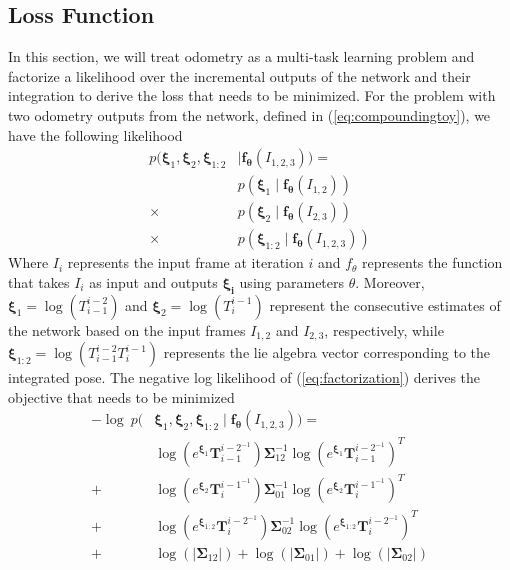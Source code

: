 \documentclass[letterpaper, 10 pt]{ieeeconf}  %
\begin{document}
\subsection{Loss Function}
In this section, we will treat odometry as a multi-task learning problem and factorize a likelihood over the incremental outputs of the network and their integration to derive the loss that needs to be minimized. For the problem with two odometry outputs from the network, defined in (\ref{eq:compoundingtoy}), we have the following likelihood
\begin{equation}
\begin{split}
p(\boldsymbol{\xi}_{1}, \boldsymbol{\xi}_{2}, \boldsymbol{\xi}_{1:2}& \mid \mathbf{f}_{\boldsymbol{\theta}}(I_{1,2,3}))=\\ &p(\boldsymbol{\xi}_{1} \mid \mathbf{f}_{\boldsymbol{\theta}}(I_{1, 2})) \\\times~& p(\boldsymbol{\xi}_{2} \mid \mathbf{f}_{\boldsymbol{\theta}}(I_{2, 3})) \\\times~& p(\boldsymbol{\xi}_{1:2} \mid \mathbf{f}_{\boldsymbol{\theta}}(I_{1,2,3}))
\end{split}
\label{eq:factorization}
\end{equation}
Where $I_i$ represents the input frame at iteration $i$ and $f_\theta$ represents the function that takes $I_i$ as input and outputs $\boldsymbol{\xi_{i}}$ using parameters $\theta$. Moreover, $\boldsymbol{\xi}_{1}=\log(T^{i-2}_{i-1})$ and $\boldsymbol{\xi}_{2}=\log(T^{i-1}_{i})$ represent the consecutive estimates of the network based on the input frames $I_{1,2}$ and $I_{2,3}$, respectively, while $\boldsymbol{\xi}_{1:2}=\log(T^{i-2}_{i-1}T^{i-1}_{i})$ represents the lie algebra vector corresponding to the integrated pose. The negative log likelihood of (\ref{eq:factorization}) derives the objective that needs to be minimized
\begin{equation}
\begin{split}
-\log~p(&\boldsymbol{\xi}_{1}, \boldsymbol{\xi}_{2}, \boldsymbol{\xi}_{1:2} \mid \mathbf{f}_{\boldsymbol{\theta}}(I_{1,2,3}))=\\ 
& \log(e^{\boldsymbol{\xi}_{1}}\mathbf{T}_{i-1}^{i-2^{-1}})\boldsymbol{\Sigma}_{12}^{-1}\log(e^{\boldsymbol{\xi}_{1}}\mathbf{T}_{i-1}^{i-2^{-1}})^T\\
+& \log(e^{\boldsymbol{\xi}_{2}}\mathbf{T}_{i}^{i-1^{-1}})\boldsymbol{\Sigma}_{01}^{-1}\log(e^{\boldsymbol{\xi}_{2}}\mathbf{T}_{i}^{i-1^{-1}})^T\\
+& \log(e^{\boldsymbol{\xi}_{1:2}}\mathbf{T}_{i}^{i-2^{-1}})\boldsymbol{\Sigma}_{02}^{-1}\log(e^{\boldsymbol{\xi}_{1:2}}\mathbf{T}_{i}^{i-2^{-1}})^T\\
+& \log(|\boldsymbol{\Sigma}_{12}|)+\log(|\boldsymbol{\Sigma}_{01}|)+\log(|\boldsymbol{\Sigma}_{02}|)
\end{split}
\label{eq:negloglikelihood}
\end{equation}
\end{document}
